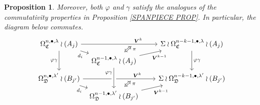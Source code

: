 \documentclass[a4paper,10pt
,draft
]{article}%
\numberwithin{equation}{section}
\numberwithin{figure}{section}
\newtheorem{proposition}[equation]{Proposition}%
\theoremstyle{definition} %
\newcommand{\1}{\ensuremath{\mathbbm 1}}%
\begin{document}
\begin{proposition}
	
	Moreover, both $\varphi$ and $\gamma$ satisfy the analogues of the commutativity properties in Proposition \ref{SPANPIECE PROP}.
	In particular, the diagram below commutes.
	\[
	\begin{tikzcd}[column sep = 5pt, row sep = 4pt]
	\Omega^{n,\bullet,\lambda}_{\mathfrak{C}} \wr (A_j)
	\ar{rrrrr}[name=toE2,near end]{\boldsymbol{V}^k} \ar{rd}[swap]{d_i} \ar{dd}[swap]{\varphi \gamma}
	&&&
	&&
	\Sigma \wr \Omega^{n-k-1,\bullet,\lambda}_{\mathfrak{C}} \wr (A_j) \ar{dd}{\varphi \gamma}
	\\
	&
	|[alias=DBE2]|
	\Omega^{n-1,\bullet,\lambda}_{\mathfrak{C}} \wr (A_j) \ar{rrrru}[swap]{\boldsymbol{V}^{k-1}}
	\\
	\Omega^{n,\bullet,\lambda'}_{\mathfrak{D}} \wr (B_{j'}) \ar{rrrrr}[name=toB2, near end]{\boldsymbol{V}^k} \ar{rd}[swap]{d_i}
	&&&
	&&
	\Sigma \wr \Omega^{n-k-1,\bullet,\lambda'}_{\mathfrak{D}} \wr (B_{j'})
	\\
	&
	|[alias=D2]| \Omega^{n-1,\bullet,\lambda'}_{\mathfrak{D}} \wr (B_{j'}) \ar{rrrru}[swap]{\boldsymbol{V}^{k-1}}
	\arrow[Leftrightarrow, from=DBE2, to=toE2, shorten <=0.1cm,shorten >=0.15cm
	,swap,near end,"\pi"
	]
	\arrow[Leftrightarrow, from=D2, to=toB2, shorten <=0.1cm,shorten >=0.15cm,swap,near end,"\pi"]
	\arrow[from=DBE2, to=D2, crossing over, near start, swap, "\varphi \gamma"]
	\end{tikzcd}
	\]

\end{proposition}
\end{document}
